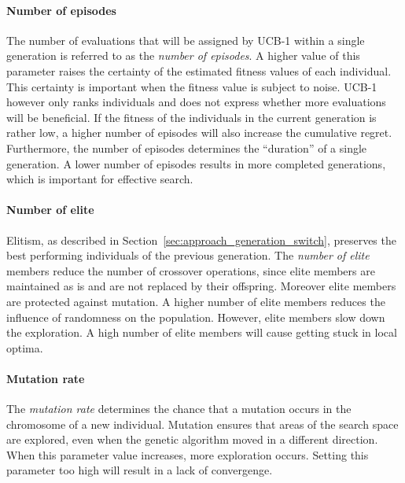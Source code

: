 \paragraph{Number of episodes} The number of evaluations that will be assigned
by UCB-1 within a single generation is referred to as the \emph{number of
episodes}. A higher value of this parameter raises the certainty of the
estimated fitness values of each individual. This certainty is important when
the fitness value is subject to noise. UCB-1 however only ranks individuals and
does not express whether more evaluations will be beneficial. If
the fitness of the individuals in the current generation is rather low, a
higher number of episodes will also increase the cumulative regret.
Furthermore, the number of episodes determines the ``duration'' of a single
generation. A lower number of episodes results in more completed generations,
which is important for effective search.
\paragraph{Number of elite}  Elitism, as described in Section~\ref{sec:approach_generation_switch},
preserves the best performing individuals of the previous generation. The
\emph{number of elite} members reduce the number of crossover operations, since
elite members are maintained as is and are not replaced by their offspring.
Moreover elite members are protected against mutation. A higher number of elite
members reduces the influence of randomness on the population. However, elite
members slow down the exploration. A high number of elite members will cause
getting stuck in local optima.
\paragraph{Mutation rate} The \emph{mutation rate} determines the chance that a
mutation occurs in the chromosome of a new individual. Mutation ensures that
areas of the search space are explored, even when the genetic algorithm moved
in a different direction. When this parameter value increases, more exploration
occurs. Setting this parameter too high will result in a lack of convergenge.
